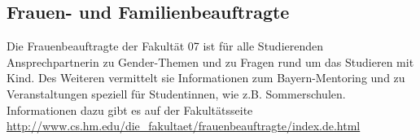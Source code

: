 \subsection{Frauen- und Familienbeauftragte}
Die Frauenbeauftragte der Fakultät 07 ist für alle Studierenden 
Ansprechpartnerin zu Gender-Themen und zu Fragen rund um das 
Studieren mit Kind. Des Weiteren vermittelt sie Informationen zum 
Bayern-Mentoring und zu Veranstaltungen speziell für Studentinnen, 
wie z.B. Sommerschulen. Informationen dazu gibt es auf der 
Fakultätsseite
\url{http://www.cs.hm.edu/die_fakultaet/frauenbeauftragte/index.de.html}